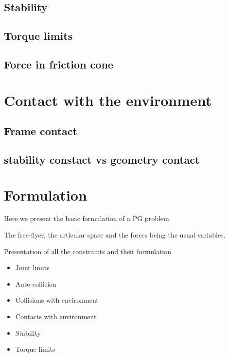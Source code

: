 \subsection{Stability}
\label{sub:stability}

\subsection{Torque limits}
\label{sub:torque_limits}

\subsection{Force in friction cone}
\label{sub:force_in_friction_cone}

\section{Contact with the environment}
\label{sec:contact_with_the_environment}

\subsection{Frame contact}
\label{sub:frame_contact}

\subsection{stability constact vs geometry contact}
\label{sub:stability_constact_vs_geometry_contact}
















\section{Formulation}

Here we present the basic formulation of a PG problem.

The free-flyer, the articular space and the forces being the usual variables.

Presentation of all the constraints and their formulation
\begin{itemize}
  \item Joint limits
  \item Auto-collision
  \item Collisions with environment
  \item Contacts with environment
  \item Stability
  \item Torque limits
\end{itemize}

